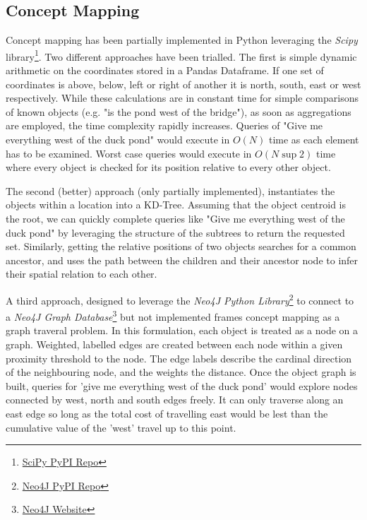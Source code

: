 \subsection{Concept Mapping}
Concept mapping has been partially implemented in Python leveraging the \textit{Scipy} library\footnote{\href{https://pypi.org/project/scipy/}{SciPy PyPI Repo}}. Two different approaches have been trialled. 
The first is simple dynamic arithmetic on the coordinates stored in a Pandas Dataframe. If one set of coordinates is above, below, left or right of another it is north, south, east or west respectively. 
While these calculations are in constant time for simple comparisons of known objects (e.g. "is the pond west of the bridge"), as soon as aggregations are employed, the time complexity rapidly increases. 
Queries of "Give me everything west of the duck pond" would execute in $O(N)$ time as each element has to be examined. Worst case queries would execute in $O(N\sup{2})$ time where every object is checked for its position relative to every other object. 

The second (better) approach (only partially implemented), instantiates the objects within a location into a KD-Tree. 
Assuming that the object centroid is the root, we can quickly complete queries like "Give me everything west of the duck pond" by leveraging the structure of the subtrees to return the requested set. 
Similarly, getting the relative positions of two objects searches for a common ancestor, and uses the path between the children and their ancestor node to infer their spatial relation to each other.

A third approach, designed to leverage the \textit{Neo4J Python Library}\footnote{\href{https://pypi.org/project/neo4j/}{Neo4J PyPI Repo}} to connect to a \textit{Neo4J Graph Database}\footnote{\href{https://neo4j.com/}{Neo4J Website}} but not implemented frames concept mapping as a graph traveral problem. 
In this formulation, each object is treated as a node on a graph. Weighted, labelled edges are created between each node within a given proximity threshold to the node. 
The edge labels describe the cardinal direction of the neighbouring node, and the weights the distance. 
Once the object graph is built, queries for 'give me everything west of the duck pond' would explore nodes connected by west, north and south edges freely. 
It can only traverse along an east edge so long as the total cost of travelling east would be lest than the cumulative value of the 'west' travel up to this point. 

